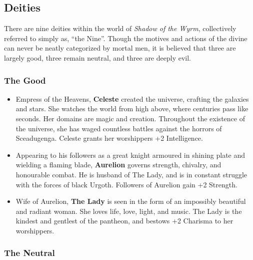 \subsection{Deities}

There are nine deities within the world of {\it Shadow of the Wyrm}, 
collectively referred to simply as, ``the Nine''.  Though the motives and 
actions of the divine can never be neatly categorized by mortal men, it is 
believed that three are largely good, three remain neutral, and three are 
deeply evil.

\subsubsection{The Good}

\begin{itemize}
\item Empress of the Heavens, {\bf Celeste} created the universe, crafting 
the galaxies and stars.  She watches the world from high above, where 
centuries pass like seconds.  Her domains are magic and creation.  
Throughout the existence of the universe, she has waged countless battles 
against the horrors of Sceadugenga.  Celeste grants her worshippers +2 
Intelligence.

\item Appearing to his followers as a great knight armoured in shining
plate and wielding a flaming blade, {\bf Aurelion} governs strength, 
chivalry, and honourable combat.  He is husband of The Lady, and is in 
constant struggle with the forces of black Urgoth.  Followers of Aurelion 
gain +2 Strength.

\item Wife of Aurelion, {\bf The Lady} is seen in the form of an 
impossibly beautiful and radiant woman.  She loves life, love, light, and 
music.  The Lady is the kindest and gentlest of the pantheon, and bestows 
+2 Charisma to her worshippers.
\end{itemize}

\subsubsection{The Neutral}

